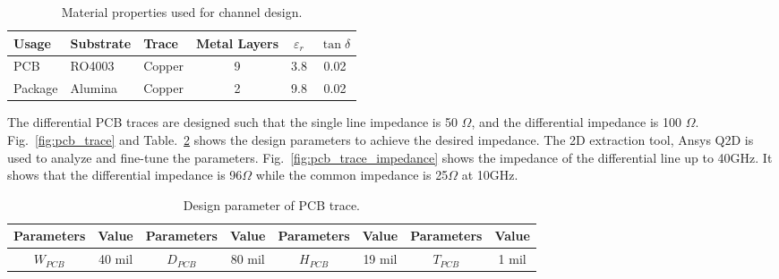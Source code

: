 \documentclass{book}  %
\renewcommand{\subsection}[1]{\psubsection{#1}}
\begin{document}
\begin{paper}
\begin{table}[h]
	\renewcommand{\arraystretch}{1.3}
	\begin{center}
		\begin{tabular}{| l | l | l | c | c | c |}
			\hline
			Usage   & Substrate  & Trace & Metal Layers & $\varepsilon_r$ & $\tan\delta$ \\ \hline
			PCB     & RO4003  \cite{na_ro4003_rogers} & Copper & 9 & 3.8 & 0.02  \\ \hline
			Package & Alumina \cite{na_alumina_substratess} & Copper & 2 & 9.8 & 0.02 \\
			\hline
		\end{tabular}
	\end{center}
	\label{table:material}
	\caption{Material properties used for channel design.}
	\vskip0.2in
\end{table}
 
\subsection{PCB Traces}
\label{subsec:pcb_traces}
The differential PCB traces are designed such that the single line impedance is 50 $\Omega$, and the differential impedance is 100 $\Omega$. Fig.~\ref{fig:pcb_trace} and Table.~\ref{table:pcb_trace} shows the design parameters to achieve the desired impedance. The 2D extraction tool, Ansys Q2D is used to analyze and fine-tune the parameters. Fig.~\ref{fig:pcb_trace_impedance} shows the impedance of the differential line up to 40GHz. It shows that the differential impedance is 96$\Omega$ while the common impedance is 25$\Omega$ at 10GHz. 

\begin{table}[htbp!]
	\renewcommand{\arraystretch}{1.3}	
	\begin{center}
		\begin{tabular}{| c | c | c | c | c | c | c | c |}
			\hline
			Parameters  & Value  & Parameters & Value  & Parameters & Value  & Parameters & Value \\ \hline
			$W_{PCB}$   & 40 mil & $D_{PCB}$  & 80 mil & $H_{PCB}$  & 19 mil & $T_{PCB}$  & 1 mil \\
			\hline
		\end{tabular}
	\end{center}
	\label{table:pcb_trace}
	\caption{Design parameter of PCB trace.}
	\vskip0.2in
\end{table}


\end{paper}
\end{document}
